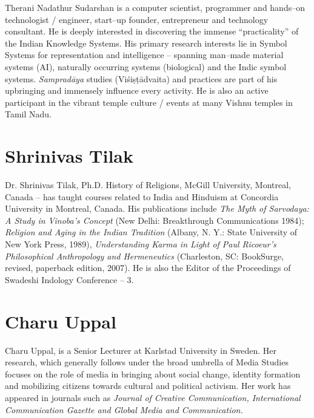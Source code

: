 Therani Nadathur Sudarshan is a computer scientist, programmer and hands–on technologist / engineer, start–up founder, entrepreneur and technology consultant. He is deeply interested in discovering the immense “practicality” of the Indian Knowledge Systems. His primary research interests lie in Symbol Systems for representation and intelligence – spanning man–made material systems (AI), naturally occurring systems (biological) and the Indic symbol systems. \textit{Sampradāya} studies (Viśiṣṭādvaita) and practices are part of his upbringing and immensely influence every activity. He is also an active participant in the vibrant temple culture / events at many Vishnu temples in Tamil Nadu.

\section*{Shrinivas Tilak}

Dr. Shrinivas Tilak, Ph.D. History of Religions, McGill University, Montreal, Canada – has taught courses related to India and Hinduism at Concordia University in Montreal, Canada. His publications include \textit{The Myth of Sarvodaya: A Study in Vinoba's Concept} (New Delhi: Breakthrough Communications 1984); \textit{Religion and Aging in the Indian Tradition} (Albany, N. Y.: State University of New York Press, 1989), \textit{Understanding Karma in Light of Paul Ricoeur's Philosophical Anthropology and Hermeneutics} (Charleston, SC: BookSurge, revised, paperback edition, 2007). He is also the Editor of the Proceedings of Swadeshi Indology Conference – 3.

\section*{Charu Uppal}

Charu Uppal, is a Senior Lecturer at Karlstad University in Sweden. Her research, which generally follows under the broad umbrella of Media Studies focuses on the role of media in bringing about social change, identity formation and mobilizing citizens towards cultural and political activism. Her work has appeared in journals such as \textit{Journal of Creative Communication, International Communication Gazette and Global Media and Communication.}

